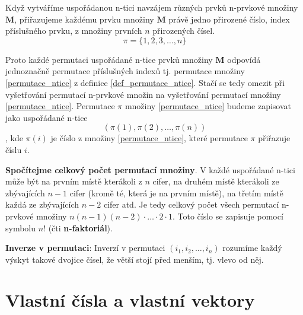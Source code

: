       \begin{definition}\label{def_permutace_ntice}
        Když vytváříme uspořádanou n-tici navzájem různých prvků n-prv\-ko\-vé množiny $\mathbf{M}$,
        přiřazujeme každému prvku množiny $\mathbf{M}$ právě jedno přirozené číslo, index příslušného
        prvku, z množiny prvních $n$ přirozených čísel.
        \begin{equation}\label{permutace_ntice}
          \pi = \lbrace 1, 2, 3, \ldots, n\rbrace
        \end{equation}
      \end{definition}
  
      Proto každé permutaci uspořádané n-tice prvků množiny $\mathbf{M}$ odpovídá jednoznačně permutace 
      příslušných indexů tj. permutace množiny \ref{permutace_ntice} z definice \ref{def_permutace_ntice}. 
      Stačí se tedy omezit při vyšetřování permutací n-prvkové množin na vyšetřování permutací množiny 
      \ref{permutace_ntice}. Permutace $\pi$ množiny \ref{permutace_ntice} budeme zapisovat jako uspořádané 
      n-tice $$\left(\pi(1), \pi(2) ,\ldots, \pi(n)\right)$$, kde $\pi(i)$ je číslo z množiny
      \ref{permutace_ntice}, které permutace $\pi$ přiřazuje číslu $i$.
      \begin{example}\label{ex_celk_pocet_permutaci}\textbf{Spočítejme celkový počet permutací
        množiny}. V kaž\-dé uspořádané n-tici může být na prvním místě kterákoli z $n$ cifer, na
        druhém místě kterákoli ze zbývajících $n-1$ cifer (kromě té, která je na prvním místě), na
        třetím místě každá ze zbývajících $n-2$ cifer atd. Je tedy celkový počet všech permutací
        n-prvkové množiny $n(n-1)(n-2)\cdot \ldots \cdot2\cdot1$.
        Toto číslo se zapisuje pomocí symbolu $n!$ (čti \textbf{n-faktoriál}).
      \end{example}
      \begin{definition}\label{def_inv_perm}\textbf{Inverze v permutaci}:
        Inverzí v permutaci $\left(i_1,i_2,…,i_n \right)$ rozumíme každý výskyt takové dvojice čísel,
        že větší stojí před menším, tj. vlevo od něj.
      \end{definition}  
   
  \section{Vlastní čísla a vlastní vektory}
